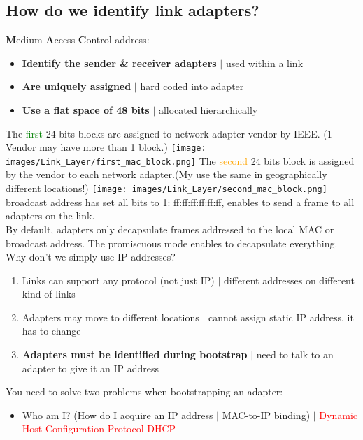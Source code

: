 \documentclass[a4paper, fontsize=8pt, landscape, DIV=1]{scrartcl}
\begin{document}
\begin{multicols*}{4}
   			\subsection{How do we identify link adapters?}
   			\textbf{M}edium \textbf{A}ccess \textbf{C}ontrol address:
   			\vspace{-0.2cm}
   			\begin{itemize}[noitemsep]
   				\item \textbf{Identify the sender \& receiver adapters} $\vert$ used within a link
   				\item \textbf{Are uniquely assigned} $\vert$ hard coded into adapter
   				\item \textbf{Use a flat space of 48 bits} $\vert$ allocated hierarchically 
   			\end{itemize}
   			The \textcolor{Green}{first} 24 bits blocks are assigned to network adapter vendor by IEEE. (1 Vendor may have more than 1 block.)
   			\texttt{[image: images/Link\_Layer/first\_mac\_block.png]}
   			The \textcolor{Orange}{second} 24 bits block is assigned by the vendor to each network adapter.(My use the same in geographically different locations!)
   			\texttt{[image: images/Link\_Layer/second\_mac\_block.png]}
   			broadcast address has set all bits to 1: ff:ff:ff:ff:ff:ff, enables to send a frame to all adapters on the link.\\
   			By default, adapters only decapsulate frames addressed to the local MAC or broadcast address. The promiscuous mode enables to decapsulate everything.\\
   			Why don't we simply use IP-addresses?
   			\begin{enumerate}[noitemsep]
   				\item Links can support any protocol (not just IP) $\vert$ different addresses on different kind of links
   				\item Adapters may move to different locations $\vert$ cannot assign static IP address, it has to change
   				\item \textbf{Adapters must be identified during bootstrap} $\vert$ need to talk to an adapter to give it an IP address 
   			\end{enumerate} 
   			You need to solve two problems when bootstrapping an adapter:
   			\begin{itemize}[noitemsep]
   				\item Who am I? (How do I acquire an IP address $\vert$ MAC-to-IP binding) $\vert$ \textcolor{Red}{Dynamic Host Configuration Protocol DHCP}

\end{itemize}
\end{multicols*}
\end{document}
